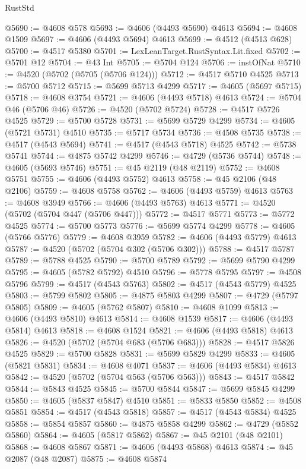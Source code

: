 \begin{lexlean}{RustStd}
\begin{coremodule}
@5690 := @4608 @578
@5693 := @4606 (@4493 @5690) @4613
@5694 := @4608 @1509
@5697 := @4606 (@4493 @5694) @4613
@5699 := @4512 (@4513 @628)
@5700 := @4517 @5380
@5701 := LexLeanTarget.RustSyntax.Lit.fixed
@5702 := @5701 @12
@5704 := @43 Int
@5705 := @5704 @124
@5706 := instOfNat
@5710 := @4520 (@5702 (@5705 (@5706 @124)))
@5712 := @4517 @5710 @4525
@5713 := @5700 @5712
@5715 := @5699 @5713 @4299
@5717 := @4605 (@5697 @5715)
@5718 := @4608 @3754
@5721 := @4606 (@4493 @5718) @4613
@5724 := @5704 @46 (@5706 @46)
@5726 := @4520 (@5702 @5724)
@5728 := @4517 @5726 @4525
@5729 := @5700 @5728
@5731 := @5699 @5729 @4299
@5734 := @4605 (@5721 @5731) @4510
@5735 := @5717 @5734
@5736 := @4508 @5735
@5738 := @4517 (@4543 @5694)
@5741 := @4517 (@4543 @5718) @4525
@5742 := @5738 @5741
@5744 := @4875 @5742 @4299
@5746 := @4729 (@5736 @5744)
@5748 := @4605 (@5693 @5746)
@5751 := @45 @2119 (@48 @2119)
@5752 := @4608 @5751
@5755 := @4606 (@4493 @5752) @4613
@5758 := @45 @2106 (@48 @2106)
@5759 := @4608 @5758
@5762 := @4606 (@4493 @5759) @4613
@5763 := @4608 @3949
@5766 := @4606 (@4493 @5763) @4613
@5771 := @4520 (@5702 (@5704 @447 (@5706 @447)))
@5772 := @4517 @5771
@5773 := @5772 @4525
@5774 := @5700 @5773
@5776 := @5699 @5774 @4299
@5778 := @4605 (@5766 @5776)
@5779 := @4608 @3959
@5782 := @4606 (@4493 @5779) @4613
@5787 := @4520 (@5702 (@5704 @302 (@5706 @302)))
@5788 := @4517 @5787
@5789 := @5788 @4525
@5790 := @5700 @5789
@5792 := @5699 @5790 @4299
@5795 := @4605 (@5782 @5792) @4510
@5796 := @5778 @5795
@5797 := @4508 @5796
@5799 := @4517 (@4543 @5763)
@5802 := @4517 (@4543 @5779) @4525
@5803 := @5799 @5802
@5805 := @4875 @5803 @4299
@5807 := @4729 (@5797 @5805)
@5809 := @4605 (@5762 @5807)
@5810 := @4608 @1099
@5813 := @4606 (@4493 @5810) @4613
@5814 := @4608 @1539
@5817 := @4606 (@4493 @5814) @4613
@5818 := @4608 @1524
@5821 := @4606 (@4493 @5818) @4613
@5826 := @4520 (@5702 (@5704 @683 (@5706 @683)))
@5828 := @4517 @5826 @4525
@5829 := @5700 @5828
@5831 := @5699 @5829 @4299
@5833 := @4605 (@5821 @5831)
@5834 := @4608 @4071
@5837 := @4606 (@4493 @5834) @4613
@5842 := @4520 (@5702 (@5704 @563 (@5706 @563)))
@5843 := @4517 @5842
@5844 := @5843 @4525
@5845 := @5700 @5844
@5847 := @5699 @5845 @4299
@5850 := @4605 (@5837 @5847) @4510
@5851 := @5833 @5850
@5852 := @4508 @5851
@5854 := @4517 (@4543 @5818)
@5857 := @4517 (@4543 @5834) @4525
@5858 := @5854 @5857
@5860 := @4875 @5858 @4299
@5862 := @4729 (@5852 @5860)
@5864 := @4605 (@5817 @5862)
@5867 := @45 @2101 (@48 @2101)
@5868 := @4608 @5867
@5871 := @4606 (@4493 @5868) @4613
@5874 := @45 @2087 (@48 @2087)
@5875 := @4608 @5874

\end{coremodule}
\end{lexlean}
